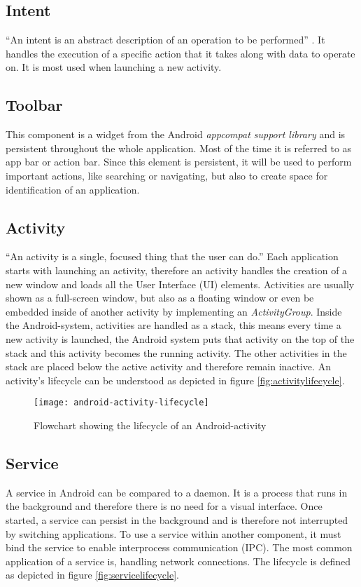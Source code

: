 \subsection{Intent}
``An intent is an abstract description of an operation to be performed'' \autocite{AndroidIntent}. It handles the execution of a specific action that it takes along with data to operate on. It is most used when launching a new activity.

\subsection{Toolbar}
This component is a widget from the Android \emph{appcompat support library} and is persistent throughout the whole application. Most of the time it is referred to as app bar or action bar. Since this element is persistent, it will be used to perform important actions, like searching or navigating, but also to create space for identification of an application.

\subsection{Activity}
``An activity is a single, focused thing that the user can do.'' \autocite{AndroidActivity} Each application starts with launching an activity, therefore an activity handles the creation of a new window and loads all the User Interface (UI) elements. Activities are usually shown as a full-screen window, but also as a floating window or even be embedded inside of another activity by implementing an \textit{ActivityGroup}. Inside the Android-system, activities are handled as a stack, this means every time a new activity is launched, the Android system puts that activity on the top of the stack and this activity becomes the running activity. The other activities in the stack are placed below the active activity and therefore remain inactive. An activity's lifecycle can be understood as depicted in figure \vref{fig:activitylifecycle}.

\begin{figure}[H]
    \centering
    \texttt{[image: android-activity-lifecycle]}
    \caption{Flowchart showing the lifecycle of an Android-activity}
    \label{fig:activitylifecycle}
\end{figure}

\subsection{Service}
A service in Android can be compared to a daemon. It is a process that runs in the background and therefore there is no need for a visual interface. Once started, a service can persist in the background and is therefore not interrupted by switching applications. To use a service within another component, it must bind the service to enable interprocess communication (IPC). The most common application of a service is, handling network connections. The lifecycle is defined as depicted in figure \vref{fig:servicelifecycle}.

